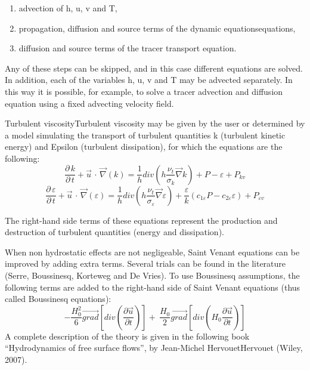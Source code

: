 \begin{enumerate}
\item  advection of h, u, v and T,

\item  propagation, diffusion and source terms of the dynamic equationsequations,

\item  diffusion and source terms of the tracer transport equation.
\end{enumerate}

 Any of these steps can be skipped, and in this case different equations are solved. In addition, each of the variables h, u, v and T may be advected separately. In this way it is possible, for example, to solve a tracer advection and diffusion equation using a fixed advecting velocity field.

 Turbulent viscosityTurbulent viscosity may be given by the user or determined by a model simulating the transport of turbulent quantities k (turbulent kinetic energy) and Epsilon (turbulent dissipation), for which the equations are the following:
\[\frac{\partial \, k}{\partial \, t} +\vec{u}\, \cdot \, \vec{\nabla }(k)=\frac{1}{h} div(h\frac{\nu _{t} }{\sigma _{k} } \vec{\nabla }k)+P-\varepsilon +P_{kv} \]
\[\frac{\partial \, \varepsilon }{\partial \, t} +\vec{u}\, \cdot \, \vec{\nabla }(\varepsilon )=\frac{1}{h} div(h\frac{\nu _{t} }{\sigma _{\varepsilon } } \vec{\nabla }\varepsilon )+\frac{\varepsilon }{k} (c_{1\varepsilon } P-c_{2\varepsilon } \varepsilon )+P_{\varepsilon v} \]


 The right-hand side terms of these equations represent the production and destruction of turbulent quantities (energy and dissipation).

 When non hydrostatic effects are not negligeable, Saint Venant equations can be improved by adding extra terms. Several trials can be found in the literature (Serre, Boussinesq, Korteweg and De Vries). To use Boussinesq assumptions, the following terms are added to the right-hand side of Saint Venant equations (thus called Boussinesq equations):
\[-\frac{H^2_0}{6}\overrightarrow{grad}\left[div\left(\frac{\partial \overrightarrow{u}}{\partial t}\right)\right]+\ \frac{H_0}{2}\overrightarrow{grad}\left[div\left(H_0\frac{\partial \overrightarrow{u}}{\partial t}\right)\right]\]
 A complete description of the theory is given in the following book ``Hydrodynamics of free surface flows'', by Jean-Michel HervouetHervouet (Wiley, 2007).



